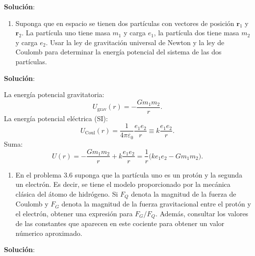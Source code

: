 \documentclass{article}
\newenvironment{AGbox}[1][7]%
{%
  \begin{tcolorbox}[
    enhanced, breakable,
    colframe=AppleGreen,
    colback=AppleGreen!#1,
    boxrule=1pt,
    borderline west={2mm}{-10mm}{AppleGreen},
    sharp corners=southwest,
    left=14pt,right=14pt,top=10pt,bottom=10pt,
     boxsep=6pt,
  ]%
}{%
  \end{tcolorbox}%
}
\begin{document}
\textcolor{Cinnabar}{\textbf{Solución}}:

\begin{AGbox}[8]
\begin{enumerate}[label={{\textcolor{trueblue}{\textbf{Pr.} \arabic*.6}}}, start=3]
  \item Suponga que en espacio se tienen dos partículas con vectores de posición $\boldsymbol{r}_{1}$ y $\boldsymbol{r}_{2}$. La partícula uno tiene masa $m_{1}$ y carga $e_{1}$, la partícula dos tiene masa $m_{2}$ y carga $e_{2}$. Usar la ley de gravitación universal de Newton y la ley de Coulomb para determinar la energía potencial del sistema de las dos partículas.
\end{enumerate}
\end{AGbox}

\textcolor{Cinnabar}{\textbf{Solución}}:

La energía potencial gravitatoria:
\[
U_{\text{grav}}(r) = -\frac{G m_1 m_2}{r}.
\]
La energía potencial eléctrica (SI):
\[
U_{\text{Coul}}(r) = \frac{1}{4\pi\varepsilon_0}\frac{e_1 e_2}{r} \equiv k\frac{e_1 e_2}{r}.
\]
Suma:
\[
\boxed{U(r) = -\frac{G m_1 m_2}{r} + k\frac{e_1 e_2}{r} = \frac{1}{r}\bigl(k e_1 e_2 - G m_1 m_2\bigr).}
\]


\begin{AGbox}[8]
\begin{enumerate}[label={{\textcolor{trueblue}{\textbf{Pr.} \arabic*.7}}}, start=3]
  \item En el problema 3.6 suponga que la partícula uno es un protón y la segunda un electrón. Es decir, se tiene el modelo proporcionado por la mecánica clásica del átomo de hidrógeno. Si $F_{Q}$ denota la magnitud de la fuerza de Coulomb y $F_{G}$ denota la magnitud de la fuerza gravitacional entre el protón y el electrón, obtener una expresión para $F_{G}/F_{Q}$. Además, consultar los valores de las constantes que aparecen en este cociente para obtener un valor númerico aproximado.
\end{enumerate}
\end{AGbox}

\textcolor{Cinnabar}{\textbf{Solución}}:
\end{document}
